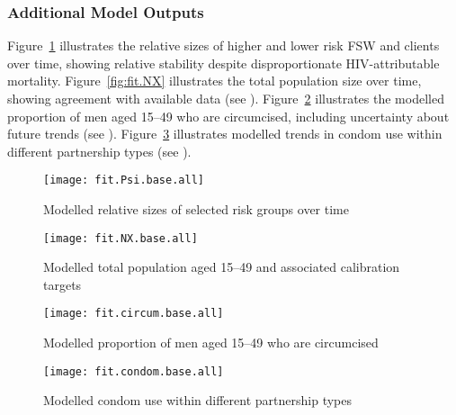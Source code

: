 \subsubsection{Additional Model Outputs}\label{sr.cal.other}
Figure~\ref{fig:fit.Psi} illustrates
the relative sizes of higher and lower risk FSW and clients over time,
showing relative stability despite disproportionate HIV-attributable mortality.
Figure~\ref{fig:fit.NX} illustrates the total population size over time,
showing agreement with available data \cite{WorldBank} (see ).
Figure~\ref{fig:fit.circum} illustrates
the modelled proportion of men aged 15--49 who are circumcised,
including uncertainty about future trends (see ).
Figure~\ref{fig:fit.condom} illustrates
modelled trends in condom use within different partnership types (see ).
\begin{figure}
  \centering\texttt{[image: fit.Psi.base.all]}
  \caption{Modelled relative sizes of selected risk groups over time}
  \label{fig:fit.Psi}
\end{figure}
\begin{figure}
  \begin{minipage}[t]{.45\linewidth}
    \centering\texttt{[image: fit.NX.base.all]}
    \caption{Modelled total population aged 15--49
      and associated calibration targets}
    \label{fig:fit.NX}
  \end{minipage}\hfill
  \begin{minipage}[t]{.45\linewidth}
    \centering\texttt{[image: fit.circum.base.all]}
    \caption{Modelled proportion of men aged 15--49 who are circumcised}
    \label{fig:fit.circum}
  \end{minipage}
\end{figure}
\begin{figure}
  \centering\texttt{[image: fit.condom.base.all]}
  \caption{Modelled condom use within different partnership types}
  \label{fig:fit.condom}
\end{figure}
